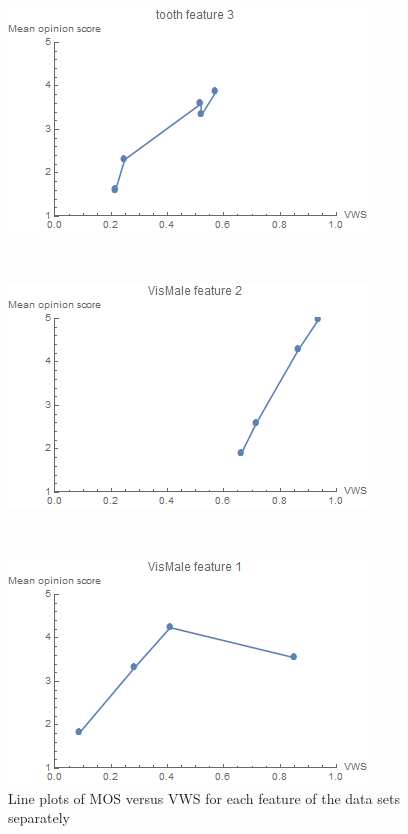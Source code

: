 \begin{figure}
\begin{minipage}{.24\textwidth}
		\subcaption{}
	\end{minipage}~
	\begin{minipage}{.24\textwidth}
		\includegraphics[width=1\linewidth]{images/mos_vs_metric_tooth_feature_3}
		\subcaption{}
	\end{minipage}~
	\begin{minipage}{.24\textwidth}
		\includegraphics[width=1\linewidth]{images/mos_vs_metric_VisMale_feature_2}
		\subcaption{}
	\end{minipage}~
	\begin{minipage}{.24\textwidth}
		\includegraphics[width=1\linewidth]{images/mos_vs_metric_VisMale_feature_1}
		\subcaption{}
	\end{minipage}
	\caption{Line plots of MOS versus VWS for each feature of the data sets separately}
	\label{fig:mos_vs_metric}
\end{figure}


